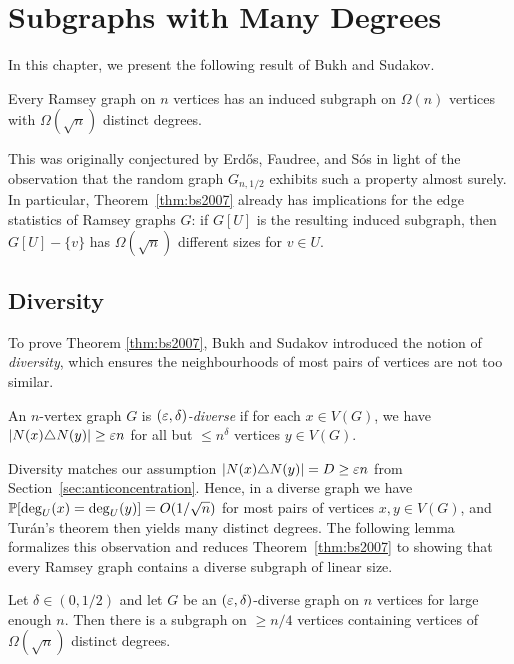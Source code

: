 \section{Subgraphs with Many Degrees}
\label{sec:ch2}

In this chapter, we present the following result of Bukh and Sudakov.

\begin{theorem}
  \label{thm:bs2007}
  Every Ramsey graph on $n$ vertices has an induced subgraph on $\Omega(n)$ vertices with $\Omega(\sqrt{n})$ distinct degrees.
\end{theorem}

This was originally conjectured by Erd\H{o}s, Faudree, and S\'{o}s \cite{EFS} in light of the observation that the random graph $G_{n, 1/2}$ exhibits such a property almost surely. In particular, Theorem~\ref{thm:bs2007} already has implications for the edge statistics of Ramsey graphs $G$: if $G[U]$ is the resulting induced subgraph, then $G[U] - \{v\}$ has $\Omega(\sqrt{n})$ different sizes for $v \in U$.

\subsection{Diversity}

To prove Theorem \ref{thm:bs2007}, Bukh and Sudakov introduced the notion of \textit{diversity}, which ensures the neighbourhoods of most pairs of vertices are not too similar.

\begin{definition}
  \label{def:diversity}

  An $n$-vertex graph $G$ is \textit{$(\varepsilon, \delta)$-diverse} if for each $x \in V(G)$, we have $|N(x) \triangle N(y)| \geq \varepsilon n$ for all but $\leq n^{\delta}$ vertices $y \in V(G)$.
\end{definition}

Diversity matches our assumption $|N(x) \triangle N(y)| = D \geq \varepsilon n$ from Section~\ref{sec:anticoncentration}. Hence, in a diverse graph we have $\mathbb{P}[\operatorname{deg}_U(x) = \operatorname{deg}_U(y)] = O(1/\sqrt{n})$ for most pairs of vertices $x, y \in V(G)$, and Tur\'{a}n's theorem then yields many distinct degrees. The following lemma formalizes this observation and reduces Theorem~\ref{thm:bs2007} to showing that every Ramsey graph contains a diverse subgraph of linear size.

\begin{lemma}
  \label{lem:diversity-degrees}

  Let $\delta \in (0, 1/2)$ and let $G$ be an $(\varepsilon, \delta)$-diverse graph on $n$ vertices for large enough $n$. Then there is a subgraph on $\geq n/4$ vertices containing vertices of $\Omega(\sqrt{n})$ distinct degrees.
\end{lemma}

